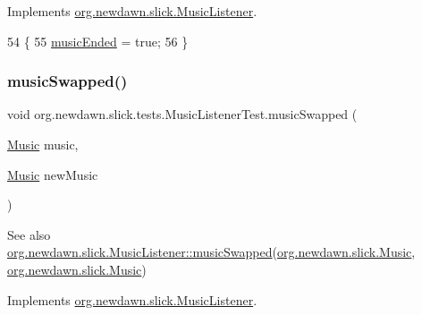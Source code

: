 Implements \mbox{\hyperlink{interfaceorg_1_1newdawn_1_1slick_1_1_music_listener_af0d830c22b57e9d811d91e0e430b122e}{org.\+newdawn.\+slick.\+Music\+Listener}}.


\begin{DoxyCode}
54                                         \{
55         \mbox{\hyperlink{classorg_1_1newdawn_1_1slick_1_1tests_1_1_music_listener_test_ad701c702ddf8e4f55e1d6e2b9e8b25c7}{musicEnded}} = \textcolor{keyword}{true};
56     \}
\end{DoxyCode}
\mbox{\label{classorg_1_1newdawn_1_1slick_1_1tests_1_1_music_listener_test_afec2f67261476d841473bf75637cc595}} 
\subsubsection{\texorpdfstring{music\+Swapped()}{musicSwapped()}}
{\footnotesize\ttfamily void org.\+newdawn.\+slick.\+tests.\+Music\+Listener\+Test.\+music\+Swapped (\begin{DoxyParamCaption}\item[{\mbox{\hyperlink{classorg_1_1newdawn_1_1slick_1_1_music}{Music}}}]{music,  }\item[{\mbox{\hyperlink{classorg_1_1newdawn_1_1slick_1_1_music}{Music}}}]{new\+Music }\end{DoxyParamCaption})\hspace{0.3cm}{\ttfamily [inline]}}

\begin{DoxySeeAlso}{See also}
\mbox{\hyperlink{interfaceorg_1_1newdawn_1_1slick_1_1_music_listener_a29d640b90aae8c8de8a9bfe903eff2e3}{org.\+newdawn.\+slick.\+Music\+Listener\+::music\+Swapped}}(\mbox{\hyperlink{classorg_1_1newdawn_1_1slick_1_1_music}{org.\+newdawn.\+slick.\+Music}}, \mbox{\hyperlink{classorg_1_1newdawn_1_1slick_1_1_music}{org.\+newdawn.\+slick.\+Music}}) 
\end{DoxySeeAlso}


Implements \mbox{\hyperlink{interfaceorg_1_1newdawn_1_1slick_1_1_music_listener_a29d640b90aae8c8de8a9bfe903eff2e3}{org.\+newdawn.\+slick.\+Music\+Listener}}.


